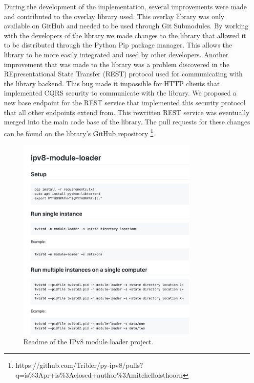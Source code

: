 During the development of the implementation, several improvements were made and contributed to the overlay library used. This overlay library was only available on GitHub and needed to be used through Git Submodules. By working with the developers of the library we made changes to the library that allowed it to be distributed through the Python Pip package manager. This allows the library to be more easily integrated and used by other developers. Another improvement that was made to the library was a problem discovered in the REpresentational State Transfer (REST) protocol used for communicating with the library backend. This bug made it impossible for HTTP clients that implemented CQRS security to communicate with the library. We proposed a new base endpoint for the REST service that implemented this security protocol that all other endpoints extend from. This rewritten REST service was eventually merged into the main code base of the library. The pull requests for these changes can be found on the library's GitHub repository \footnote{https://github.com/Tribler/py-ipv8/pulls?q=is\%3Apr+is\%3Aclosed+author\%3Amitchellolsthoorn}.

\begin{figure}[h!]
	\centering
	\includegraphics[width=0.8\textwidth]{images/readme.png}
	\caption{\label{fig:project-readme} Readme of the IPv8 module loader project.}
\end{figure}

